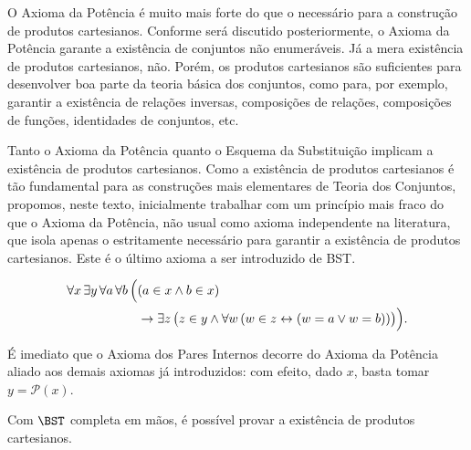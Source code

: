 O Axioma da Potência é muito mais forte do que o necessário para a construção de produtos cartesianos.
Conforme será discutido posteriormente, o Axioma da Potência garante a existência de conjuntos não enumeráveis.
Já a mera existência de produtos cartesianos, não.
Porém, os produtos cartesianos são suficientes para desenvolver boa parte da teoria básica dos conjuntos, como para, por exemplo, garantir a existência de relações inversas, composições de relações, composições de funções, identidades de conjuntos, etc.

Tanto o Axioma da Potência quanto o Esquema da Substituição implicam a existência de produtos cartesianos.
Como a existência de produtos cartesianos é tão fundamental para as construções mais elementares de Teoria dos Conjuntos, propomos, neste texto, inicialmente trabalhar com um princípio mais fraco do que o Axioma da Potência, não usual como axioma independente na literatura, que isola apenas o estritamente necessário para garantir a existência de produtos cartesianos.
Este é o último axioma a ser introduzido de BST.

\begin{axiom}\label{ax:paresInternos}
    \[
        \begin{aligned}
            \forall x\, \exists y\, \forall a\, \forall b\, \Bigl(
                &(a \in x \land b \in x) \\
                &\rightarrow \exists z\, \bigl(
                    z \in y
                    \land
                    \forall w\, (w \in z \leftrightarrow (w = a \lor w = b))
                \bigr)
            \Bigr).
        \end{aligned}
    \]
\end{axiom}

É imediato que o Axioma dos Pares Internos decorre do Axioma da Potência aliado aos demais axiomas já introduzidos: com efeito, dado $x$, basta tomar $y=\mathcal P(x)$.

Com $\BST$ completa em mãos, é possível provar a existência de produtos cartesianos.


